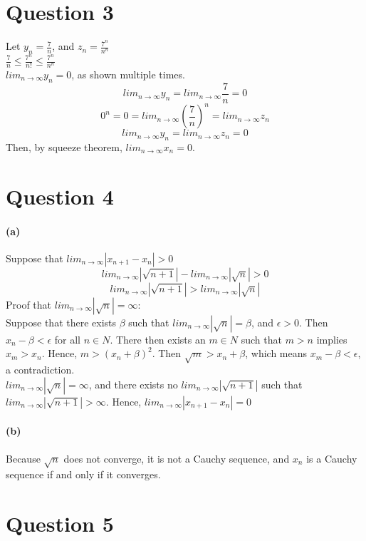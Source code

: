 \documentclass[10pt,letter]{article}
\begin{document}
\section*{Question 3}
Let $y_n = \frac{7}{n}$, and $z_n = \frac{7^n}{n^n}$\\
$\frac{7}{n} \leq \frac{7^n}{n!} \leq \frac{7^n}{n^n}$ \\
$lim_{n\rightarrow\infty}y_n = 0$, as shown multiple times. 
$$lim_{n\rightarrow\infty}y_n = lim_{n\rightarrow\infty}\frac{7}{n} = 0$$
$$0^n = 0 = lim_{n\rightarrow\infty}(\frac{7}{n})^n = lim_{n\rightarrow\infty}z_n$$
$$lim_{n\rightarrow\infty}y_n = lim_{n\rightarrow\infty}z_n = 0$$
Then, by squeeze theorem, $lim_{n\rightarrow\infty}x_n = 0$.

\section*{Question 4}

\paragraph{(a)}
Suppose that $lim_{n\rightarrow\infty}|x_{n+1}-x_n| > 0$
$$lim_{n\rightarrow\infty}|\sqrt{n+1}| - lim_{n\rightarrow\infty}|\sqrt{n}| > 0$$
$$lim_{n\rightarrow\infty}|\sqrt{n+1}| > lim_{n\rightarrow\infty}|\sqrt{n}|$$
Proof that $lim_{n\rightarrow\infty}|\sqrt{n}| = \infty$: \\ 
Suppose that there exists $\beta$ such that $lim_{n\rightarrow\infty}|\sqrt{n}| = \beta$, and $\epsilon > 0$. Then $x_n - \beta < \epsilon$ for all $n \in N$. There then exists an $m \in N$ such that $m > n$ implies $x_m > x_n$. Hence, $m > (x_n + \beta)^2$. Then $\sqrt{m} > x_n + \beta$, which means $x_m - \beta < \epsilon$, a contradiction. \\ 
$lim_{n\rightarrow\infty}|\sqrt{n}| = \infty$, and there exists no $lim_{n\rightarrow\infty}|\sqrt{n+1}|$ such that $lim_{n\rightarrow\infty}|\sqrt{n+1}| > \infty$. Hence, $lim_{n\rightarrow\infty}|x_{n+1} - x_n| = 0$

\paragraph{(b)}
Because $\sqrt{n}$ does not converge, it is not a Cauchy sequence, and $x_n$ is a Cauchy sequence if and only if it converges.


\section*{Question 5}
\end{document}
